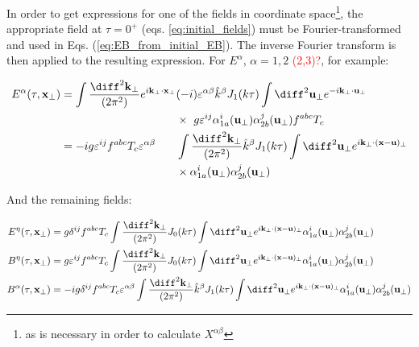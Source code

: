 In order to get expressions for one of the fields in coordinate  space\textcolor{red}{\footnote{as is necessary in order to calculate $X^{\alpha \beta}$}}, the appropriate field at $\tau=0^+$ (eqs. \ref{eq:initial_fields}) must be Fourier-transformed and used in Eqs. (\ref{eq:EB_from_initial_EB}). The inverse Fourier transform is then applied to the resulting expression. For $E^\alpha$, $\alpha=1,2$ \textcolor{red}{(2,3)?}, for example:

\begin{equation}
	\begin{alignedat}{2}
		E^\alpha (\tau,\mathbf{x}_\perp) & =  \int \frac{\diff^2 \mathbf{k}_\perp}{(2\pi^2)} e^{i \mathbf{k}_\perp \cdot \mathbf{x}_\perp} & & (-i)   \varepsilon^{\alpha \beta} \hat{k}^\beta J_1 (k \tau)  \int \diff^2 \mathbf{u}_\perp e^{-i \mathbf{k}_\perp \cdot \mathbf{u}_\perp} \\
		& ~ & & \times ~ g \varepsilon^{ij} \alpha^i_{1a} (\mathbf{u}_\perp) \alpha^j_{2b}(\mathbf{u}_\perp) f^{abc} T_c \\
		& = -ig \varepsilon^{ij} f^{abc} T_c \varepsilon^{\alpha \beta} & & \int  \frac{\diff^2 \mathbf{k}_\perp}{(2\pi^2)} \hat{k}^\beta J_1 (k \tau) \int \diff^2 \mathbf{u}_\perp e^{i \mathbf{k}_\perp \cdot (\mathbf{x} - \mathbf{u})_\perp}  \\
		& ~ & & \times \alpha^i_{1a} (\mathbf{u}_\perp) \alpha^j_{2b}(\mathbf{u}_\perp)
	\end{alignedat}
\end{equation}

And the remaining fields:

\begin{align}
	E^\eta (\tau,\mathbf{x}_\perp) & = g \delta^{ij} f^{abc} T_c \int  \frac{\diff^2 \mathbf{k}_\perp}{(2\pi^2)} J_0 (k \tau) \int \diff^2 \mathbf{u}_\perp e^{i \mathbf{k}_\perp \cdot (\mathbf{x} - \mathbf{u})_\perp} \alpha^i_{1a} (\mathbf{u}_\perp) \alpha^j_{2b}(\mathbf{u}_\perp) \\
	B^\eta (\tau,\mathbf{x}_\perp) & = g \varepsilon^{ij} f^{abc} T_c \int  \frac{\diff^2 \mathbf{k}_\perp}{(2\pi^2)} J_0 (k \tau) \int \diff^2 \mathbf{u}_\perp e^{i \mathbf{k}_\perp \cdot (\mathbf{x} - \mathbf{u})_\perp} \alpha^i_{1a} (\mathbf{u}_\perp) \alpha^j_{2b}(\mathbf{u}_\perp) \\
	B^\alpha (\tau,\mathbf{x}_\perp) & = -ig \delta^{ij} f^{abc} T_c \varepsilon^{\alpha \beta} \int  \frac{\diff^2 \mathbf{k}_\perp}{(2\pi^2)} \hat{k}^\beta J_1 (k \tau) \int \diff^2 \mathbf{u}_\perp e^{i \mathbf{k}_\perp \cdot (\mathbf{x} - \mathbf{u})_\perp} \alpha^i_{1a} (\mathbf{u}_\perp) \alpha^j_{2b}(\mathbf{u}_\perp)
\end{align}
